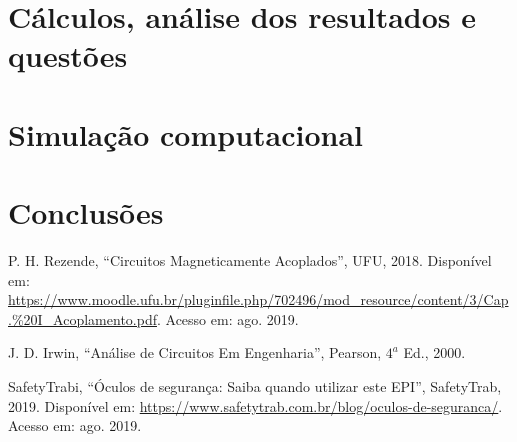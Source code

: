 \documentclass[a4paper,12pt,oneside,openany,table,xcdraw]{article}
\begin{document}
\section{Cálculos, análise dos resultados e questões} %


\section{Simulação computacional} %

\section{Conclusões} %


\newpage
\begin{thebibliography}{9} 
    P. H. Rezende,
    “Circuitos Magneticamente Acoplados”, UFU, 2018.
 Disponível em:
 \url{https://www.moodle.ufu.br/pluginfile.php/702496/mod_resource/content/3/Cap.\%20I_Acoplamento.pdf}. Acesso em: ago. 2019.

    J. D. Irwin,
    “Análise de Circuitos Em Engenharia”, Pearson, $4^a$ Ed., 2000.


    SafetyTrabi,
    “Óculos de segurança: Saiba quando utilizar este EPI”, SafetyTrab, 2019.
 Disponível em:
 \url{https://www.safetytrab.com.br/blog/oculos-de-seguranca/}. Acesso em: ago. 2019.




\end{thebibliography}
\end{document}
